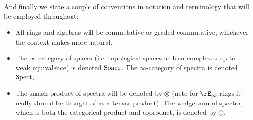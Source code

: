 And finally we state a couple of conventions in notation and
terminology that will be employed throughout:
\begin{itemize}
\item All rings and algebras will be commutative or
  graded-commutative, whichever the context makes more natural.
\item The $\infty$-category of spaces (i.e. topological spaces or Kan
  complexes up to weak equivalence) is denoted $\mathrm{Space}$. The
  $\infty$-category of spectra is denoted $\mathrm{Spect}$.
\item The smash product of spectra will be denoted by $\otimes$ (note
  for $\rE_\infty$-rings it really should be thought of as a tensor
  product). The wedge sum of spectra, which is both the categorical
  product and coproduct, is denoted by $\oplus$.
\end{itemize}

